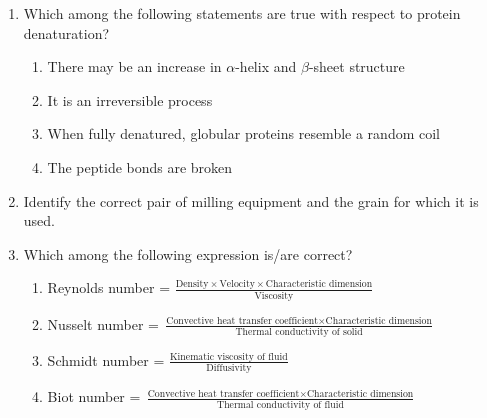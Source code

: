 \documentclass[journal,12pt,onecolumn]{IEEEtran}
\theoremstyle{remark}
\begin{document}
\begin{enumerate}
    \item Which among the following statements are true with respect to protein denaturation?

    \hfill{}
    \begin{enumerate}
        \item There may be an increase in $\alpha$-helix and $\beta$-sheet structure
        \item It is an irreversible process
        \item When fully denatured, globular proteins resemble a random coil
        \item The peptide bonds are broken
    \end{enumerate}

    \item Identify the correct pair of milling equipment and the grain for which it is used.

    \hfill{}
    \begin{enumerate}
    \end{enumerate}

    \item Which among the following expression is/are correct?

    \hfill{}
    \begin{enumerate}
        \item Reynolds number = $\frac{\text{Density} \times \text{Velocity} \times \text{Characteristic dimension}}{\text{Viscosity}}$
        \item Nusselt number = $\frac{\text{Convective heat transfer coefficient} \times \text{Characteristic dimension}}{\text{Thermal conductivity of solid}}$
        \item Schmidt number = $\frac{\text{Kinematic viscosity of fluid}}{\text{Diffusivity}}$
        \item Biot number = $\frac{\text{Convective heat transfer coefficient} \times \text{Characteristic dimension}}{\text{Thermal conductivity of fluid}}$
    \end{enumerate}


\end{enumerate}
\end{document}

